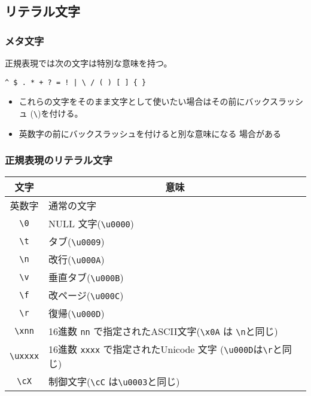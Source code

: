 \documentclass[dvipsk]{beamer}
\begin{document}
\subsection{リテラル文字}
\begin{frame}[containsverbatim]
 \frametitle{メタ文字}
正規表現では次の文字は特別な意味を持つ。
\begin{verbatim}
^ $ . * + ? = ! | \ / ( ) [ ] { }
\end{verbatim}
\begin{itemize}
 \item これらの文字をそのまま文字として使いたい場合はその前にバックスラッシュ
(\verb+\+)を付ける。
 \item 英数字の前にバックスラッシュを付けると別な意味になる
場合がある
\end{itemize}
\end{frame}
\begin{frame}[containsverbatim]
 \frametitle{正規表現のリテラル文字}
\begin{center}
 \begin{tabular}{|c|m{}|}\hline
  文字&\multicolumn{1}{c|}{意味}\\\hline
  英数字&通常の文字 \\\hline
  \verb+\0+&NULL 文字(\verb+\u0000+) \\ \hline
  \verb+\t+& タブ(\verb+\u0009+)\\ \hline
  \verb+\n+& 改行(\verb+\u000A+)\\ \hline
  \verb+\v+& 垂直タブ(\verb+\u000B+)\\ \hline
  \verb+\f+& 改ページ(\verb+\u000C+)\\ \hline
  \verb+\r+& 復帰(\verb+\u000D+)\\ \hline
  \verb+\xnn+& 16進数 \texttt{nn} で指定されたASCII文字(\verb+\x0A+ は
      \verb+\n+と同じ)\\ \hline
  \verb+\uxxxx+&16進数 \texttt{xxxx} で指定されたUnicode 文字
      (\verb+\u000D+は\verb+\r+と同じ)\\ \hline
  \verb+\cX+& 制御文字(\verb+\cC+ は\verb+\u0003+と同じ)\\ \hline
 \end{tabular}
\end{center}
\end{frame}
\end{document}
